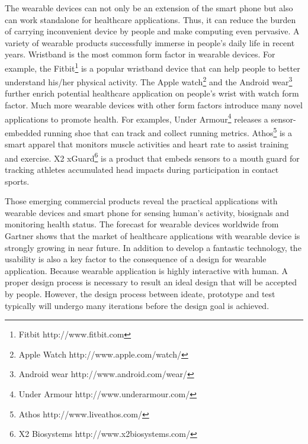 The wearable devices can not only be an extension of the smart phone but also can work standalone for healthcare applications. Thus, it can reduce the burden of carrying inconvenient device by people and make computing even pervasive.
A variety of wearable products successfully immerse in people's daily life in recent years. Wristband is the most common form factor in wearable devices. For example, the Fitbit\footnote{Fitbit
\hspace{1cm} http://www.fitbit.com} is a popular wristband device that can help people to better understand his/her physical activity. The Apple watch\footnote{Apple Watch
\hspace{1cm} http://www.apple.com/watch/} and the Android wear\footnote{Android wear
\hspace{1cm} http://www.android.com/wear/} further enrich potential healthcare application on people's wrist with watch form factor. Much more wearable devices with other form factors introduce many novel applications to promote health. For examples, Under Armour\footnote{Under Armour
\hspace{1cm} http://www.underarmour.com/} releases a sensor-embedded running shoe that can track and collect running metrics. Athos\footnote{Athos
\hspace{2cm} http://www.liveathos.com/} is a smart apparel that monitors muscle activities and heart rate to assist training and exercise. X2 xGuard\footnote{X2 Biosystems
\hspace{1cm} http://www.x2biosystems.com/}\cite{camarillo2013head} is a product that embeds sensors to a mouth guard for tracking athletes accumulated head impacts during participation in contact sports. 

Those emerging commercial products reveal the practical applications with wearable devices and smart phone for sensing human's activity, biosignals and monitoring health status. The forecast for wearable devices worldwide from Gartner\cite{gartner2016wearable} shows that the market of healthcare applications with wearable device is strongly growing in near future. In addition to develop a fantastic technology, the usability is also a key factor to the consequence of a design for wearable application. Because wearable application is highly interactive with human. A proper design process is necessary to result an ideal design that will be accepted by people. However, the design process between ideate, prototype and test typically will undergo many iterations before the design goal is achieved.


